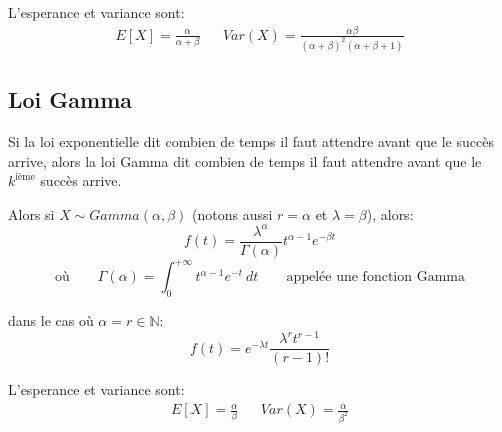 \documentclass[a4paper]{article}
\newcommand{\N}{\mathbb{N}}
\begin{document}
L'esperance et variance sont:
 \begin{align*}
     E[X] = \frac{\alpha}{\alpha + \beta} & & Var(X) = \frac{\alpha \beta}{(\alpha + \beta)^2 (\alpha + \beta + 1)}
\end{align*}

\subsection{Loi Gamma}
Si la loi exponentielle dit combien de temps il faut attendre avant que le
succès arrive, alors la loi Gamma dit combien de temps il faut attendre avant
que le $k^{\text{ième}}$ succès arrive.

Alors si $X \sim Gamma(\alpha, \beta)$ (notons aussi $r = \alpha$ et  $\lambda = \beta$), alors:
\[
    f(t) = \frac{\lambda^{\alpha}}{\Gamma(\alpha)}t^{\alpha-1}e^{-\beta t}
\] 
\[
 \text{où} \qquad   \Gamma(\alpha) = \int_{{0}}^{{+\infty}} {t^{\alpha-1}e^{-t}} \: d{t} {} \qquad \text{appelée une fonction Gamma}
\] 

dans le cas où $\alpha = r \in \N$:
\[
    f(t) = e^{-\lambda t} \frac{\lambda^r t^{r-1}}{(r-1)!}
\] 

L'esperance et variance sont:
\begin{align*}
    E[X] = \frac{\alpha}{\beta} & & Var(X) = \frac{\alpha}{\beta^2}
\end{align*}
\end{document}
